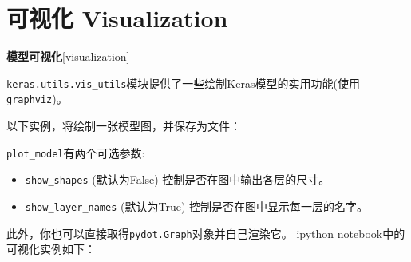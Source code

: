 \section{可视化 Visualization}
\textbf{模型可视化}\ref{visualization}

\texttt{keras.utils.vis\_utils}模块提供了一些绘制Keras模型的实用功能(使用\texttt{graphviz})。

以下实例，将绘制一张模型图，并保存为文件：

\begin{Shaded}
\begin{Highlighting}[]
  
\OperatorTok{=}\NormalTok{)}
\end{Highlighting}
\end{Shaded}

\texttt{plot\_model}有两个可选参数:

\begin{itemize}
\tightlist
\item
  \texttt{show\_shapes} (默认为False) 控制是否在图中输出各层的尺寸。
\item
  \texttt{show\_layer\_names} (默认为True)
  控制是否在图中显示每一层的名字。
\end{itemize}

此外，你也可以直接取得\texttt{pydot.Graph}对象并自己渲染它。 ipython
notebook中的可视化实例如下：

\begin{Shaded}
\begin{Highlighting}[]
  
  

\OperatorTok{=}\NormalTok{, }\OperatorTok{=}\NormalTok{))}
\end{Highlighting}
\end{Shaded}

\newpage
